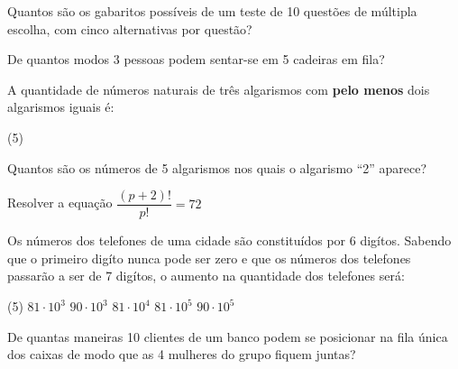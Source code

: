 \documentclass[10pt,a4paper]{article}
\begin{document}
\begin{multicols}{2}
    \begin{question}[type=exam]
        Quantos são os gabaritos possíveis de um teste de 10 questões de múltipla escolha,
        com cinco alternativas por questão?
    \end{question}

    \begin{question}[type=exam]
        De quantos modos 3 pessoas podem sentar-se em 5 cadeiras em fila?
    \end{question}

    \begin{question}[type=exam]
        A quantidade de números naturais de três algarismos com \textbf{pelo menos} dois
        algarismos iguais é:

        \begin{tasks}(5)
        \end{tasks}
    \end{question}

    \begin{question}[type=exam]
        Quantos são os números de 5 algarismos nos quais o algarismo ``2'' aparece?
    \end{question}

    \begin{question}[type=exam]
        Resolver a equação $\dfrac{(p+2)!}{p!} = 72$
    \end{question}

    \begin{question}[type=exam]
        Os números dos telefones de uma cidade são constituídos por 6 digítos.
        Sabendo que o primeiro digíto nunca pode ser zero e que os números dos
        telefones passarão a ser de 7 digítos, o aumento na quantidade dos telefones
        será:

        \begin{tasks}(5)
            \task $81 \cdot 10^3$
            \task $90 \cdot 10^3$
            \task $81 \cdot 10^4$
            \task $81 \cdot 10^5$
            \task $90 \cdot 10^5$
        \end{tasks}
    \end{question}

    \begin{question}[type=exam]
        De quantas maneiras 10 clientes de um banco podem se posicionar na fila
        única dos caixas de modo que as 4 mulheres do grupo fiquem juntas?


\end{question}
\end{multicols}
\end{document}
